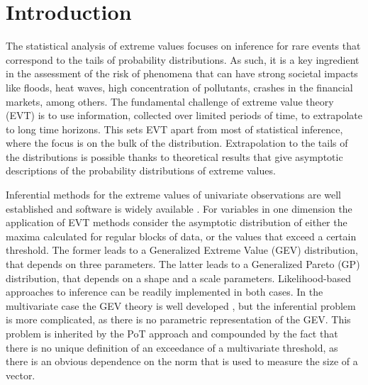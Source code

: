 
\section{Introduction}
The statistical analysis of extreme values focuses on inference for
rare events that correspond to the tails of probability distributions.
As such, it is a key ingredient in the assessment of the risk of
phenomena that can have strong societal impacts like floods, heat waves,
high concentration of pollutants, crashes in the financial markets,
among others. The fundamental challenge of extreme value theory (EVT) is
to use information, collected over limited periods of time, to
extrapolate to long time horizons. This sets EVT apart from most of
statistical inference, where the focus is on the bulk of the
distribution. Extrapolation to the tails of the distributions is
possible thanks to theoretical results that give asymptotic descriptions
of the probability distributions of extreme values. 

Inferential methods for the extreme values of univariate observations
are well established and software is widely available \cite[see, for
example,][]{coles2001}. For variables in one dimension the application of EVT methods consider the asymptotic distribution of either the maxima calculated for regular blocks of data, or the values that exceed a certain threshold. The former leads to a Generalized Extreme Value (GEV) distribution, that depends on three parameters. The latter leads to a Generalized Pareto (GP) distribution, that depends on a shape and a scale parameters. Likelihood-based approaches to inference can be readily implemented in both cases.
In the multivariate case the GEV theory is well developed \citep[see, for example][]{dehaan2006}, but the inferential problem is more complicated, as there is no parametric representation of the GEV. This problem is inherited by the PoT approach and compounded by the fact that there is no unique definition of an exceedance of a multivariate threshold, as there is an obvious dependence on the norm that is used to measure the size of a vector. 

